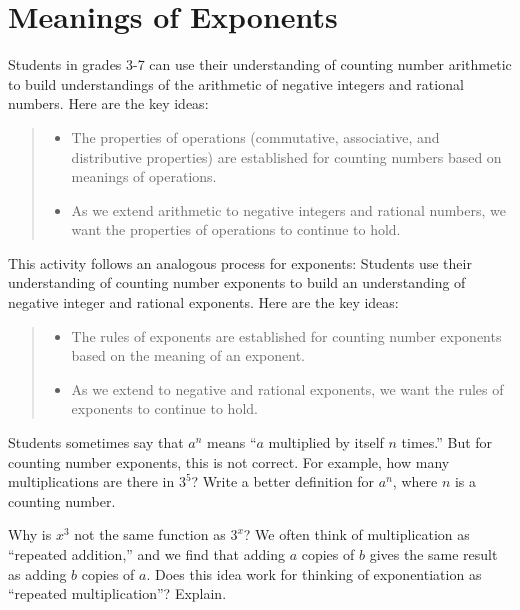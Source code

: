 \newpage
\section{Meanings of Exponents} 

Students in grades 3-7 can use their understanding of counting number arithmetic to build understandings of the arithmetic of negative integers and rational numbers.  Here are the key ideas: 
\begin{quote}
\begin{itemize}
\item The properties of operations (commutative, associative, and distributive properties) are established for counting numbers based on meanings of operations. 
\item As we extend arithmetic to negative integers and rational numbers, we want the properties of operations to continue to hold.  
\end{itemize}
\end{quote}

This activity follows an analogous process for exponents: Students use their understanding of counting number exponents to build an understanding of negative integer and rational exponents.  Here are the key ideas: 
\begin{quote}
\begin{itemize}
\item The rules of exponents are established for counting number exponents based on the meaning of an exponent.  
\item As we extend to negative and rational exponents, we want the rules of exponents to continue to hold.  
\end{itemize}
\end{quote}

\begin{prob}
Students sometimes say that $a^n$ means ``$a$ multiplied by itself $n$ times.''  But for counting number exponents, this is not correct.  For example, how many multiplications are there in $3^5$?  Write a better definition for $a^n$, where $n$ is a counting number.  
\end{prob}

\begin{prob}
Why is $x^3$ not the same function as $3^x$?  We often think of multiplication as ``repeated addition,'' and we find that adding $a$ copies of $b$ gives the same result as adding $b$ copies of $a$.  Does this idea work for thinking of exponentiation as ``repeated multiplication''?  Explain.  
\end{prob}

